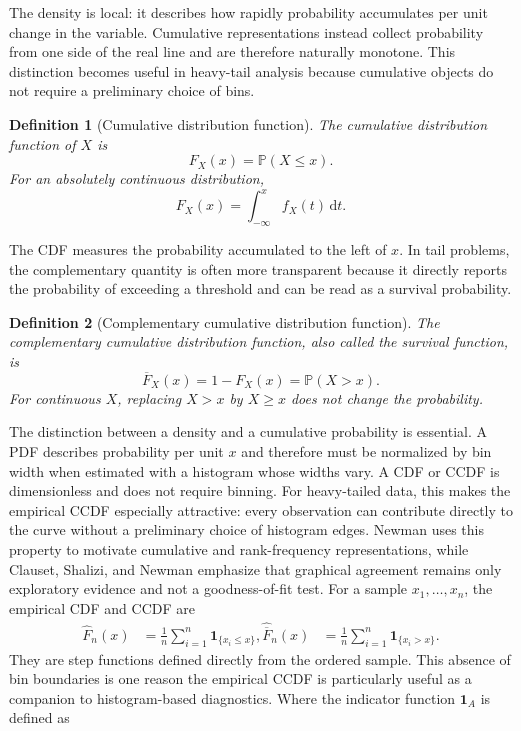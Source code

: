 \documentclass[12pt]{article}
\def\\{ }%
\newcommand{\dd}{{\mathrm{d}}}
\newtheorem{definition}{Definition}[section]
\numberwithin{equation}{section}
\begin{document}
The density is local: it describes how rapidly probability accumulates per unit change in the variable. Cumulative representations instead collect probability from one side of the real line and are therefore naturally monotone. This distinction becomes useful in heavy-tail analysis because cumulative objects do not require a preliminary choice of bins.

\begin{definition}[Cumulative distribution function]
The cumulative distribution function of $X$ is
\begin{equation}
 F_X(x)=\mathbb{P}(X\leq x).
\end{equation}
For an absolutely continuous distribution,
\begin{equation}
 F_X(x)=\int_{-\infty}^{x}f_X(t)\,\dd t.
\end{equation}
\end{definition}

The CDF measures the probability accumulated to the left of $x$. In tail problems, the complementary quantity is often more transparent because it directly reports the probability of exceeding a threshold and can be read as a survival probability.

\begin{definition}[Complementary cumulative distribution function]
The complementary cumulative distribution function, also called the survival function, is
\begin{equation}
 \overline F_X(x)=1-F_X(x)=\mathbb{P}(X>x).
\label{eq:ccdf-general}
\end{equation}
For continuous $X$, replacing $X>x$ by $X\geq x$ does not change the probability.
\end{definition}

The distinction between a density and a cumulative probability is essential. A PDF describes probability per unit $x$ and therefore must be normalized by bin width when estimated with a histogram whose widths vary. A CDF or CCDF is dimensionless and does not require binning. For heavy-tailed data, this makes the empirical CCDF especially attractive: every observation can contribute directly to the curve without a preliminary choice of histogram edges. Newman \cite{Newman2005} uses this property to motivate cumulative and rank-frequency representations, while Clauset, Shalizi, and Newman \cite{ClausetShaliziNewman2009} emphasize that graphical agreement remains only exploratory evidence and not a goodness-of-fit test. For a sample $x_1,\ldots,x_n$, the empirical CDF and CCDF are
\begin{align}
\widehat F_n(x) &= \frac{1}{n}\sum_{i=1}^{n}\mathbf{1}_{\{x_i\leq x\}}, 
\\ 
\widehat{\overline F}_n(x) &=\frac{1}{n}\sum_{i=1}^{n}\mathbf{1}_{\{x_i>x\}}.
\end{align}
They are step functions defined directly from the ordered sample. This absence of bin boundaries is one reason the empirical CCDF is particularly useful as a companion to histogram-based diagnostics. Where the indicator function $\mathbf{1}_A$ is defined as
\end{document}
